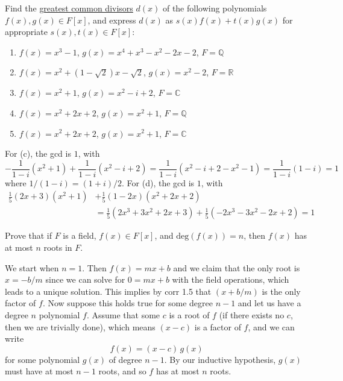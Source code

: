   \begin{exercise}[Shifrin 3.1.2.c/d]
    Find the \hyperref[def:greatest-common-divisor]{greatest common divisors} $d(x)$ of the following polynomials $f(x), g(x) \in F[x]$, and express $d(x)$ as $s(x)f(x) + t(x)g(x)$ for appropriate $s(x), t(x) \in F[x]$:
    \begin{enumerate}
      \item $f(x) = x^3 - 1$, $g(x) = x^4 + x^3 - x^2 - 2x - 2$, $F = \mathbb{Q}$
      \item $f(x) = x^2 + (1 - \sqrt{2})x - \sqrt{2}$, $g(x) = x^2 - 2$, $F = \mathbb{R}$
      \item $f(x) = x^2 + 1$, $g(x) = x^2 - i + 2$, $F = \mathbb{C}$
      \item $f(x) = x^2 + 2x + 2$, $g(x) = x^2 + 1$, $F = \mathbb{Q}$
      \item $f(x) = x^2 + 2x + 2$, $g(x) = x^2 + 1$, $F = \mathbb{C}$
    \end{enumerate}
  \end{exercise}
  \begin{solution}
    For (c), the gcd is $1$, with 
    \begin{equation} 
      -\frac{1}{1 - i} (x^2 + 1) + \frac{1}{1 - i} (x^2 - i + 2) = \frac{1}{1-i} (x^2 - i + 2 - x^2 - 1) = \frac{1}{1-i} (1 - i) = 1
    \end{equation}
    where $1/(1-i) = (1 + i)/2$. For (d), the gcd is $1$, with 
    \begin{align}
      \frac{1}{5} (2x + 3) (x^2 + 1) & + \frac{1}{5} (1 - 2x) (x^2 + 2x + 2) \\
                                          & = \frac{1}{5} (2x^3 + 3x^2 + 2x + 3) + \frac{1}{5} (-2x^3 - 3x^2 - 2x + 2) = 1
    \end{align}
  \end{solution}

  \begin{exercise}[Shifrin 3.1.6]
    Prove that if $F$ is a field, $f(x) \in F[x]$, and $\mathrm{deg}(f(x)) = n$, then $f(x)$ has at most $n$ roots in $F$. 
  \end{exercise}
  \begin{solution}
    We start when $n=1$. Then $f(x) = mx + b$ and we claim that the only root is $x = -b/m$ since we can solve for $0 = mx + b$ with the field operations, which leads to a unique solution. This implies by corr 1.5 that $(x + b/m)$ is the only factor of $f$. Now suppose this holds true for some degree $n-1$ and let us have a degree $n$ polynomial $f$. Assume that some $c$ is a root of $f$ (if there exists no $c$, then we are trivially done), which means $(x - c)$ is a factor of $f$, and we can write 
    \begin{equation}
      f(x) = (x - c) \, g(x)
    \end{equation}
    for some polynomial $g(x)$ of degree $n-1$. By our inductive hypothesis, $g(x)$ must have at most $n-1$ roots, and so $f$ has at most $n$ roots. 
  \end{solution}

